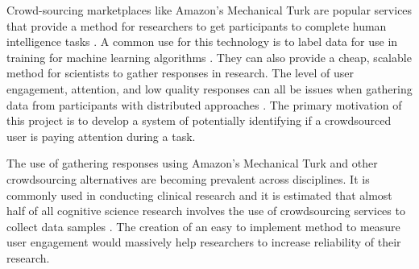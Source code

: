 \documentclass{article}
\begin{document}





Crowd-sourcing marketplaces like Amazon’s Mechanical Turk are popular services that provide a method for researchers to get participants to complete human intelligence tasks \cite{paolacci2010running}. 
A common use for this technology is to label data for use in training for machine learning algorithms \cite{chang2017revolt}.
They can also provide a cheap, scalable method for scientists to gather responses in research.
The level of user engagement, attention, and low quality responses can all be issues when gathering data from participants with distributed approaches \cite{ipeirotis2010quality}.
The primary motivation of this project is to develop a system of potentially identifying if a crowdsourced user is paying attention during a task.

The use of gathering responses using Amazon's Mechanical Turk and other crowdsourcing alternatives are becoming prevalent across disciplines.
It is commonly used in conducting clinical research \cite{chandler2016conducting} and it is estimated that almost half of all cognitive science research involves the use of crowdsourcing services to collect data samples \cite{stewart2017crowdsourcing}.
The creation of an easy to implement method to measure user engagement would massively help researchers to increase reliability of their research.
\end{document}

